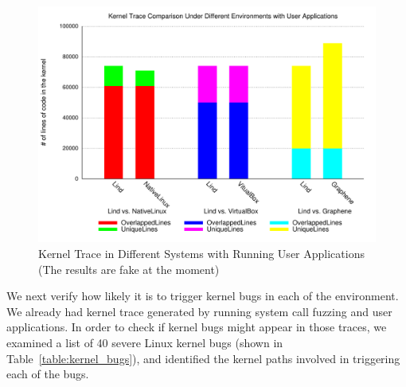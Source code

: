 \begin{figure}%
\centering
\includegraphics[width=1.0\columnwidth]{diagram/lind_ccs15_diagram_04.pdf}
\caption{Kernel Trace in Different Systems with Running User Applications {\color{red}(The results are fake at the moment)}}
\label{fig:different_systems_userapplications_trace}
\end{figure}

We next verify how likely it is to trigger kernel bugs in each of the environment.
We already had kernel trace generated by running system call fuzzing and user applications.
In order to check if kernel bugs might appear in those traces, we examined a list of 40 severe Linux 
kernel bugs (shown in Table~\ref{table:kernel_bugs}), and identified the kernel paths involved in triggering each of the bugs.


